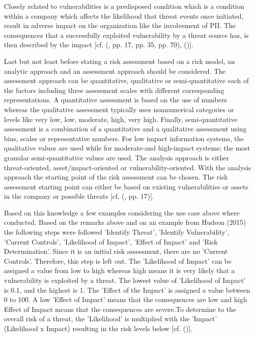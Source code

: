Closely related to vulnerabilities is a predisposed condition which is a condition within a company which affects the likelihood that threat events once initiated, result in adverse impact on the organization like the involvement of PII. The consequences that a successfully exploited vulnerability by a threat source has, is then described by the impact  [cf. (\cite{NIST:2012:GCRA}, pp. 17, pp. 35, pp. 70), (\cite{NIST:2017:SecurityNPrivacyControls})].

Last but not least before stating a risk assessment based on a risk model, an analytic approach and an assessment approach should be considered. The assessment approach can be quantitative, qualitative or semi-quantitative each of the factors including three assessment scales with different corresponding representations. A quantitative assessment is based on the use of numbers whereas the qualitative assessment typically uses nonnumerical categories or levels like very low, low, moderate, high, very high. Finally, semi-quantitative assessment is a combination of a quantitative and a qualitative assessment using bins, scales or representative numbers. For low impact information systems, the qualitative values are used while for moderate-and high-impact systems; the most granular semi-quantitative values are used. The analysis approach is either threat-oriented, asset/impact-oriented or vulnerability-oriented. With the analysis approach the starting point of the risk assessment can be chosen. The risk assessment starting point can either be based on existing vulnerabilities or assets in the company or possible threats  [cf. (\cite{NIST:2012:GCRA}, pp. 17)].

Based on this knowledge a few examples considering the use case above where conducted. Based on the remarks above and on an example from Hudson (2015) the following steps were followed  'Identify Threat', 'Identify Vulnerability', 'Current Controls', 'Likelihood of Impact', 'Effect of Impact' and 'Risk Determination'. Since it is an initial risk assessment, there are no 'Current Controls'. Therefore, this step is left out. The 'Likelihood of Impact' can be assigned a value from low to high whereas high means it is very likely that a vulnerability is exploited by a threat. The lowest value of 'Likelihood of Impact' is 0.1, and the highest is 1. The 'Effect of the Impact' is assigned a value between 0 to 100. A low 'Effect of Impact' means that the consequences are low and high Effect of Impact means that the consequences are severe.To determine to the overall risk of a threat, the 'Likelihood' is multiplied with the 'Impact' (Likelihood x Impact) resulting in the risk levels below [cf. (\cite{Hudson:2015:SecurityRisk})]. 

